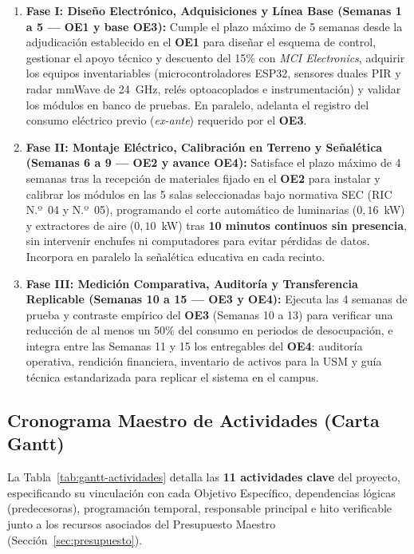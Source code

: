 \begin{enumerate}
    \item \textbf{Fase I: Diseño Electrónico, Adquisiciones y Línea Base (Semanas 1 a 5 --- OE1 y base OE3):} Cumple el plazo máximo de 5 semanas desde la adjudicación establecido en el \textbf{OE1} para diseñar el esquema de control, gestionar el apoyo técnico y descuento del 15\% con \textit{MCI Electronics}, adquirir los equipos inventariables (microcontroladores ESP32, sensores duales PIR y radar mmWave de 24~GHz, relés optoacoplados e instrumentación) y validar los módulos en banco de pruebas. En paralelo, adelanta el registro del consumo eléctrico previo (\textit{ex-ante}) requerido por el \textbf{OE3}.
    \item \textbf{Fase II: Montaje Eléctrico, Calibración en Terreno y Señalética (Semanas 6 a 9 --- OE2 y avance OE4):} Satisface el plazo máximo de 4 semanas tras la recepción de materiales fijado en el \textbf{OE2} para instalar y calibrar los módulos en las 5 salas seleccionadas bajo normativa SEC (RIC N.º~04 y N.º~05), programando el corte automático de luminarias ($0{,}16$~kW) y extractores de aire ($0{,}10$~kW) tras \textbf{10 minutos continuos sin presencia}, sin intervenir enchufes ni computadores para evitar pérdidas de datos. Incorpora en paralelo la señalética educativa en cada recinto.
    \item \textbf{Fase III: Medición Comparativa, Auditoría y Transferencia Replicable (Semanas 10 a 15 --- OE3 y OE4):} Ejecuta las 4 semanas de prueba y contraste empírico del \textbf{OE3} (Semanas 10 a 13) para verificar una reducción de al menos un 50\% del consumo en periodos de desocupación, e integra entre las Semanas 11 y 15 los entregables del \textbf{OE4}: auditoría operativa, rendición financiera, inventario de activos para la USM y guía técnica estandarizada para replicar el sistema en el campus.
\end{enumerate}

\subsection{Cronograma Maestro de Actividades (Carta Gantt)}
La Tabla~\ref{tab:gantt-actividades} detalla las \textbf{11 actividades clave} del proyecto, especificando su vinculación con cada Objetivo Específico, dependencias lógicas (predecesoras), programación temporal, responsable principal e hito verificable junto a los recursos asociados del Presupuesto Maestro (Sección~\ref{sec:presupuesto}).


